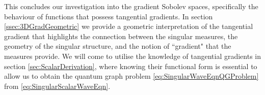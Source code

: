 This concludes our investigation into the gradient Sobolev spaces, specifically the behaviour of functions that possess tangential gradients.
In section \ref{ssec:3DGradGeometric} we provide a geometric interpretation of the tangential gradient that highlights the connection between the singular measures, the geometry of the singular structure, and the notion of ``gradient" that the measures provide.
We will come to utilise the knowledge of tangential gradients in section \ref{sec:ScalarDerivation}, where knowing their functional form is essential to allow us to obtain the quantum graph problem \eqref{eq:SingularWaveEqnQGProblem} from \eqref{eq:SingularScalarWaveEqn}.